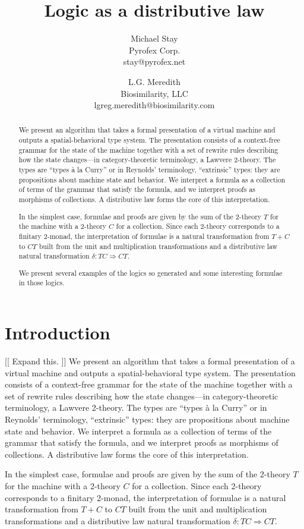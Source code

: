 \documentclass{article}
\title{Logic as a distributive law}
\author{
Michael Stay\\
  {Pyrofex Corp.}\\
  {\fontsize{8}{8}\selectfont stay@pyrofex.net}
\and
L.G. Meredith\\
  {Biosimilarity, LLC}\\
  {\fontsize{8}{8}\selectfont lgreg.meredith@biosimilarity.com}
}
\newcommand{\maps}{\colon}
\begin{document}
\maketitle
\begin{abstract}
\noindent
We present an algorithm that takes a formal presentation of a virtual machine and outputs a spatial-behavioral type system.  The presentation consists of a context-free grammar for the state of the machine together with a set of rewrite rules describing how the state changes---in category-theoretic terminology, a Lawvere 2-theory.  The types are ``types \`a la Curry'' or in Reynolds' terminology, ``extrinsic'' types: they are propositions about machine state and behavior.  We interpret a formula as a collection of terms of the grammar that satisfy the formula, and we interpret proofs as morphisms of collections.  A distributive law forms the core of this interpretation.

In the simplest case, formulae and proofs are given by the sum of the 2-theory $T$ for the machine with a 2-theory $C$ for a collection.  Since each 2-theory corresponds to a finitary 2-monad, the interpretation of formulae is a natural transformation from $T+C$ to $CT$ built from the unit and multiplication transformations and a distributive law natural transformation $\delta\maps TC \Rightarrow CT$.

We present several examples of the logics so generated and some interesting formulae in those logics.
\end{abstract}

\section{Introduction}
[[ Expand this. ]]
We present an algorithm that takes a formal presentation of a virtual machine and outputs a spatial-behavioral type system.  The presentation consists of a context-free grammar for the state of the machine together with a set of rewrite rules describing how the state changes---in category-theoretic terminology, a Lawvere 2-theory.  The types are ``types \`a la Curry'' or in Reynolds' terminology, ``extrinsic'' types: they are propositions about machine state and behavior.  We interpret a formula as a collection of terms of the grammar that satisfy the formula, and we interpret proofs as morphisms of collections.  A distributive law forms the core of this interpretation.

In the simplest case, formulae and proofs are given by the sum of the 2-theory $T$ for the machine with a 2-theory $C$ for a collection.  Since each 2-theory corresponds to a finitary 2-monad, the interpretation of formulae is a natural transformation from $T+C$ to $CT$ built from the unit and multiplication transformations and a distributive law natural transformation $\delta\maps TC \Rightarrow CT$.
\end{document}
